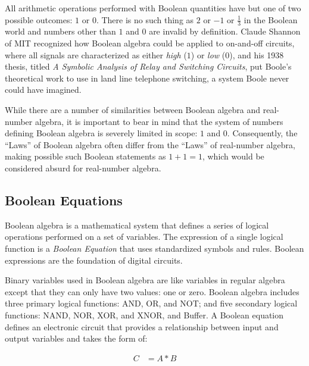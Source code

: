 All arithmetic operations performed with Boolean quantities have but one of two possible outcomes: $ 1 $ or $ 0 $. There is no such thing as $ 2 $ or $ -1 $ or $ \frac{1}{3} $ in the Boolean world and numbers other than $ 1 $ and $ 0 $ are invalid by definition. Claude Shannon of MIT recognized how Boolean algebra could be applied to on-and-off circuits, where all signals are characterized as either \emph{high} ($ 1 $) or \emph{low} ($ 0 $), and his 1938 thesis, titled \emph{A Symbolic Analysis of Relay and Switching Circuits}, put Boole's theoretical work to use in land line telephone switching, a system Boole never could have imagined.

While there are a number of similarities between Boolean algebra and real-number algebra, it is important to bear in mind that the system of numbers defining Boolean algebra is severely limited in scope: $ 1 $ and $ 0 $. Consequently, the ``Laws'' of Boolean algebra often differ from the ``Laws'' of real-number algebra, making possible such Boolean statements as $ 1 + 1 = 1 $, which would be considered absurd for real-number algebra. 

\subsection{Boolean Equations}

Boolean algebra is a mathematical system that defines a series of logical operations performed on a set of variables. The expression of a single logical function is a \emph{Boolean Equation}  that uses standardized symbols and rules. Boolean expressions are the foundation of digital circuits.

Binary variables used in Boolean algebra are like variables in regular algebra except that they can only have two values: one or zero. Boolean algebra includes three primary logical functions: \textsf{AND}, \textsf{OR}, and \textsf{NOT}; and five secondary logical functions:  \textsf{NAND}, \textsf{NOR}, \textsf{XOR}, and \textsf{XNOR}, and Buffer. A Boolean equation defines an electronic circuit that provides a relationship between input and output variables and takes the form of:

\begin{align}
\label{01:eq:simple_boolean_equation}
C &= A * B 
\end{align}


